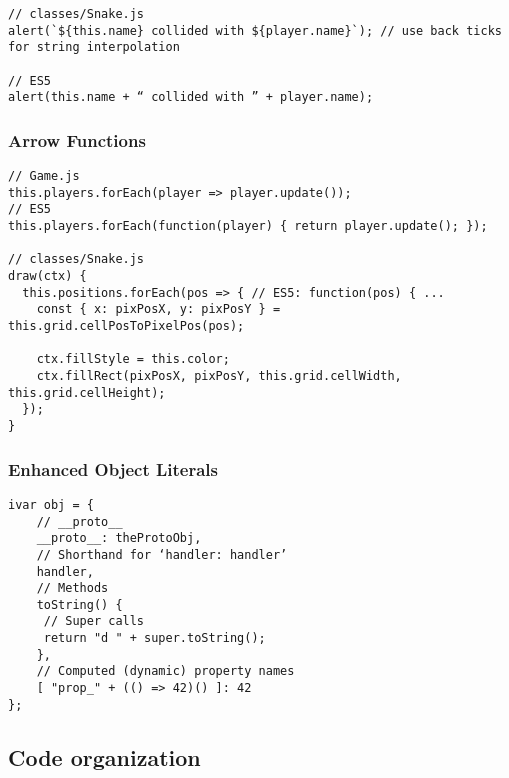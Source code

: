 \documentclass{bioinfo}
\begin{document}
\begin{lstlisting}[caption= My Javascript Example]
// classes/Snake.js
alert(`${this.name} collided with ${player.name}`); // use back ticks for string interpolation

// ES5
alert(this.name + “ collided with ” + player.name);
\end{lstlisting}

\subsubsection{Arrow Functions}

\begin{lstlisting}[caption= My Javascript Example]
// Game.js
this.players.forEach(player => player.update());
// ES5
this.players.forEach(function(player) { return player.update(); });

// classes/Snake.js
draw(ctx) {
  this.positions.forEach(pos => { // ES5: function(pos) { ...
    const { x: pixPosX, y: pixPosY } = this.grid.cellPosToPixelPos(pos);

    ctx.fillStyle = this.color;
    ctx.fillRect(pixPosX, pixPosY, this.grid.cellWidth, this.grid.cellHeight);
  });
}
\end{lstlisting}

\subsubsection{Enhanced Object Literals}

\begin{lstlisting}[caption= My Javascript Example]
ivar obj = {
    // __proto__
    __proto__: theProtoObj,
    // Shorthand for ‘handler: handler’
    handler,
    // Methods
    toString() {
     // Super calls
     return "d " + super.toString();
    },
    // Computed (dynamic) property names
    [ "prop_" + (() => 42)() ]: 42
};
\end{lstlisting}
\subsection{Code organization}



\end{document}

